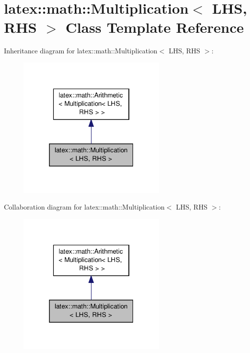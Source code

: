 \hypertarget{classlatex_1_1math_1_1Multiplication}{\section{latex\-:\-:math\-:\-:Multiplication$<$ L\-H\-S, R\-H\-S $>$ Class Template Reference}
\label{classlatex_1_1math_1_1Multiplication}
}


Inheritance diagram for latex\-:\-:math\-:\-:Multiplication$<$ L\-H\-S, R\-H\-S $>$\-:
\nopagebreak
\begin{figure}[H]
\begin{center}
\leavevmode
\includegraphics[width=208pt]{classlatex_1_1math_1_1Multiplication__inherit__graph}
\end{center}
\end{figure}


Collaboration diagram for latex\-:\-:math\-:\-:Multiplication$<$ L\-H\-S, R\-H\-S $>$\-:
\nopagebreak
\begin{figure}[H]
\begin{center}
\leavevmode
\includegraphics[width=208pt]{classlatex_1_1math_1_1Multiplication__coll__graph}
\end{center}
\end{figure}
